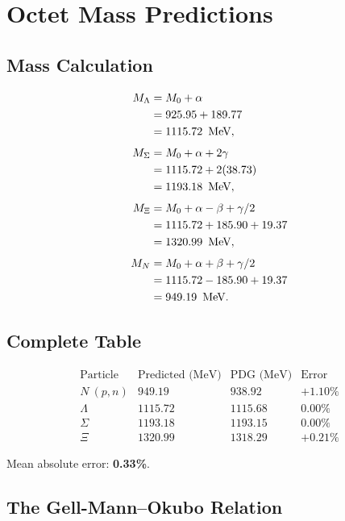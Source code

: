 \chapter{Octet Mass Predictions}
\label{ch:octet_predictions}

\section{Mass Calculation}

\[
\begin{aligned}
M_{\Lambda} &= M_0 + \alpha \\
            &= 925.95 + 189.77 \\
            &= 1115.72\ \,\text{MeV}, \\[4pt]
M_{\Sigma} &= M_0 + \alpha + 2\gamma \\
           &= 1115.72 + 2(38.73) \\
           &= 1193.18\ \,\text{MeV}, \\[4pt]
M_{\Xi} &= M_0 + \alpha - \beta + \gamma/2 \\
        &= 1115.72 + 185.90 + 19.37 \\
        &= 1320.99\ \,\text{MeV}, \\[4pt]
M_N &= M_0 + \alpha + \beta + \gamma/2 \\
    &= 1115.72 - 185.90 + 19.37 \\
    &= 949.19\ \,\text{MeV}.
\end{aligned}
\]

\section{Complete Table}

\[
\begin{array}{lccc}
\text{Particle} & \text{Predicted (MeV)} & \text{PDG (MeV)} & \text{Error} \\
\hline
N\ (p,n) & 949.19 & 938.92 & +1.10\% \\
\Lambda   & 1115.72 & 1115.68 & 0.00\% \\
\Sigma    & 1193.18 & 1193.15 & 0.00\% \\
\Xi       & 1320.99 & 1318.29 & +0.21\%
\end{array}
\]

Mean absolute error: \textbf{0.33\%}.

\section{The Gell-Mann--Okubo Relation}

